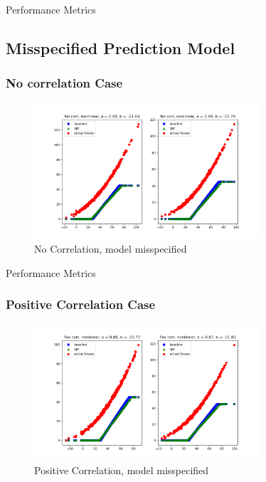\documentclass[11pt]{article}
\begin{document}
    \begin{table}[H]
        \centering
        \small
        \caption{Performance Metrics}
        \resizebox*{\columnwidth}{!}{}
    \end{table}

  \subsection{Misspecified Prediction Model}
    \subsubsection{No correlation Case}
    \begin{figure}[H]
        \centering
        \caption{No Correlation, model misspecified}
        \includegraphics[width=0.75\textwidth]{../../output/figures/Exploration/no_correlation_nonlinear.png}
    \end{figure}

    \begin{table}[H]
        \centering
        \small
        \caption{Performance Metrics}
        \resizebox*{\columnwidth}{!}{}
    \end{table}

    \subsubsection{Positive Correlation Case}
    \begin{figure}[H]
        \centering
        \caption{Positive Correlation, model misspecified}
        \includegraphics[width=0.75\textwidth]{../../output/figures/Exploration/pos_correlation_nonlinear.png}
    \end{figure}
\end{document}
